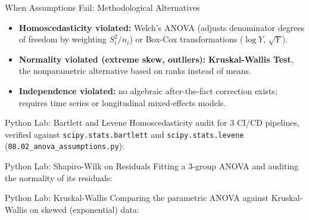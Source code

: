 \documentclass[10pt, aspectratio=169]{beamer}
\begin{document}
\begin{frame}{When Assumptions Fail: Methodological Alternatives}
  \footnotesize
  \begin{itemize}\itemsep=0.1cm
    \item \textbf{Homoscedasticity violated:} Welch's ANOVA (adjusts denominator degrees of freedom by weighting $S_i^2/n_i$) or Box-Cox transformations ($\log Y$, $\sqrt{Y}$). \pause
    \item \textbf{Normality violated (extreme skew, outliers):} \textbf{Kruskal-Wallis Test}, the nonparametric alternative based on ranks instead of means. \pause
    \item \textbf{Independence violated:} no algebraic after-the-fact correction exists; requires time series or longitudinal mixed-effects models.
  \end{itemize}
\end{frame}

\begin{frame}[fragile]{Python Lab: Bartlett and Levene}
  \scriptsize
  Homoscedasticity audit for 3 CI/CD pipelines, verified against \texttt{scipy.stats.bartlett} and \texttt{scipy.stats.levene} (\texttt{08.02\_anova\_assumptions.py}):
  {
  }
\end{frame}

\begin{frame}[fragile]{Python Lab: Shapiro-Wilk on Residuals}
  \scriptsize
  Fitting a 3-group ANOVA and auditing the normality of its residuals:
  {
  }
\end{frame}

\begin{frame}[fragile]{Python Lab: Kruskal-Wallis}
  \scriptsize
  Comparing the parametric ANOVA against Kruskal-Wallis on skewed (exponential) data:
  {
  }
\end{frame}
\end{document}
